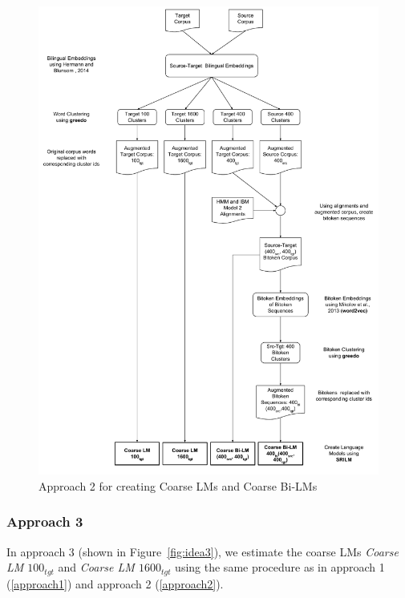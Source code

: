 \begin{figure}[htbp]
	\begin{center}
		\includegraphics[width=\textwidth]{files/images/idea2}
	\end{center}
	\caption{Approach 2 for creating Coarse LMs and Coarse Bi-LMs}
	\label{fig:idea2}
\end{figure}

\subsubsection{Approach 3}\label{approach3}
In approach 3 (shown in Figure~\ref{fig:idea3}), we estimate the coarse LMs \textit{Coarse LM $100_{tgt}$} and \textit{Coarse LM $1600_{tgt}$} using the same procedure as in approach 1 (\ref{approach1}) and approach 2 (\ref{approach2}).

